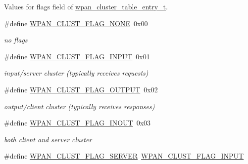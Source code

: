 Values for {\ttfamily flags} field of \hyperlink{structwpan__cluster__table__entry__t}{wpan\-\_\-cluster\-\_\-table\-\_\-entry\-\_\-t}. \begin{DoxyCompactItemize}
\item 
\hypertarget{group__wpan__aps_ga738343e3e3392f22d0a5d7615648ba53}{\#define \hyperlink{group__wpan__aps_ga738343e3e3392f22d0a5d7615648ba53}{W\-P\-A\-N\-\_\-\-C\-L\-U\-S\-T\-\_\-\-F\-L\-A\-G\-\_\-\-N\-O\-N\-E}~0x00}\label{group__wpan__aps_ga738343e3e3392f22d0a5d7615648ba53}

\begin{DoxyCompactList}\small\item\em no flags \end{DoxyCompactList}\item 
\hypertarget{group__wpan__aps_ga2024b5d21c6f8c2f151cc2b0576c08f4}{\#define \hyperlink{group__wpan__aps_ga2024b5d21c6f8c2f151cc2b0576c08f4}{W\-P\-A\-N\-\_\-\-C\-L\-U\-S\-T\-\_\-\-F\-L\-A\-G\-\_\-\-I\-N\-P\-U\-T}~0x01}\label{group__wpan__aps_ga2024b5d21c6f8c2f151cc2b0576c08f4}

\begin{DoxyCompactList}\small\item\em input/server cluster (typically receives requests) \end{DoxyCompactList}\item 
\hypertarget{group__wpan__aps_ga0456c33bdaa673f37f9285a3f5ca0172}{\#define \hyperlink{group__wpan__aps_ga0456c33bdaa673f37f9285a3f5ca0172}{W\-P\-A\-N\-\_\-\-C\-L\-U\-S\-T\-\_\-\-F\-L\-A\-G\-\_\-\-O\-U\-T\-P\-U\-T}~0x02}\label{group__wpan__aps_ga0456c33bdaa673f37f9285a3f5ca0172}

\begin{DoxyCompactList}\small\item\em output/client cluster (typically receives responses) \end{DoxyCompactList}\item 
\hypertarget{group__wpan__aps_gaf1185ec162a18803e11a83491bf57d3d}{\#define \hyperlink{group__wpan__aps_gaf1185ec162a18803e11a83491bf57d3d}{W\-P\-A\-N\-\_\-\-C\-L\-U\-S\-T\-\_\-\-F\-L\-A\-G\-\_\-\-I\-N\-O\-U\-T}~0x03}\label{group__wpan__aps_gaf1185ec162a18803e11a83491bf57d3d}

\begin{DoxyCompactList}\small\item\em both client and server cluster \end{DoxyCompactList}\item 
\hypertarget{group__wpan__aps_ga9e0a1a0abf5594d8fa5a38b1ca40b3bc}{\#define \hyperlink{group__wpan__aps_ga9e0a1a0abf5594d8fa5a38b1ca40b3bc}{W\-P\-A\-N\-\_\-\-C\-L\-U\-S\-T\-\_\-\-F\-L\-A\-G\-\_\-\-S\-E\-R\-V\-E\-R}~\hyperlink{group__wpan__aps_ga2024b5d21c6f8c2f151cc2b0576c08f4}{W\-P\-A\-N\-\_\-\-C\-L\-U\-S\-T\-\_\-\-F\-L\-A\-G\-\_\-\-I\-N\-P\-U\-T}}\label{group__wpan__aps_ga9e0a1a0abf5594d8fa5a38b1ca40b3bc}


\end{DoxyCompactItemize}
